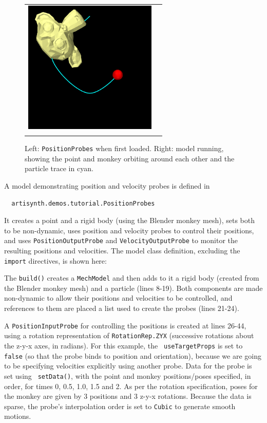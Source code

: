 \begin{figure}[ht]
\begin{center}
\begin{tabular}{cc}
  \includegraphics[height=2.5in]{images/PositionProbes1}\\
\fi
\end{tabular}
\end{center}
\caption{Left: {\tt PositionProbes} when first loaded. Right: model running,
showing the point and monkey orbiting around each other and the particle
trace in cyan.}
\label{PositionProbes:fig}
\end{figure}

A model demonstrating position and velocity probes is defined in
%
\begin{verbatim}
  artisynth.demos.tutorial.PositionProbes
\end{verbatim}
%
It creates a point and a rigid body (using the Blender monkey mesh), sets both
to be non-dynamic, uses position and velocity probes to control their
positions, and uses {\tt PositionOutputProbe} and {\tt VelocityOutputProbe} to
monitor the resulting positions and velocities. The model class definition,
excluding the {\tt import} directives, is shown here:
%
\lstset{numbers=left}
\iflatexml

\else

\fi
\lstset{numbers=none}
%
The {\tt build()} creates a {\tt MechModel} and then adds to it a rigid body
(created from the Blender monkey mesh) and a particle (lines 8-19).  Both
components are made non-dynamic to allow their positions and velocities to be
controlled, and references to them are placed a list used to create the probes
(lines 21-24).

A {\tt PositionInputProbe} for controlling the positions is created at lines
26-44, using a rotation representation of {\tt RotationRep.ZYX} (successive
rotations about the z-y-x axes, in radians). For this example, the {\tt
useTargetProps} is set to {\tt false} (so that the probe binds to {\sf
position} and {\sf orientation}), because we are going to be specifying
velocities explicitly using another probe. Data for the probe is set using {\tt
setData()}, with the point and monkey positions/poses specified, in order, for
times 0, 0.5, 1.0, 1.5 and 2. As per the rotation specification, poses for the
monkey are given by 3 positions and 3 z-y-x rotations. Because the data is
sparse, the probe's interpolation order is set to {\tt Cubic} to generate
smooth motions.

